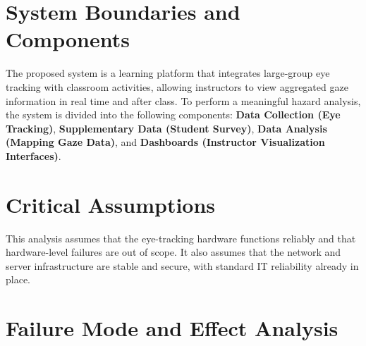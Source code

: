 \documentclass{article}
\begin{document}
\section{System Boundaries and Components}
The proposed system is a learning platform that integrates large-group eye tracking with classroom activities, allowing instructors to view aggregated gaze information in real time and after class. To perform a meaningful hazard analysis, the system is divided into the following components: \textbf{Data Collection (Eye Tracking)}, \textbf{Supplementary Data (Student Survey)}, \textbf{Data Analysis (Mapping Gaze Data)}, and \textbf{Dashboards (Instructor Visualization Interfaces)}.

\section{Critical Assumptions}
This analysis assumes that the eye-tracking hardware functions reliably and that hardware-level failures are out of scope. It also assumes that the network and server infrastructure are stable and secure, with standard IT reliability already in place.

\section{Failure Mode and Effect Analysis}
\end{document}
